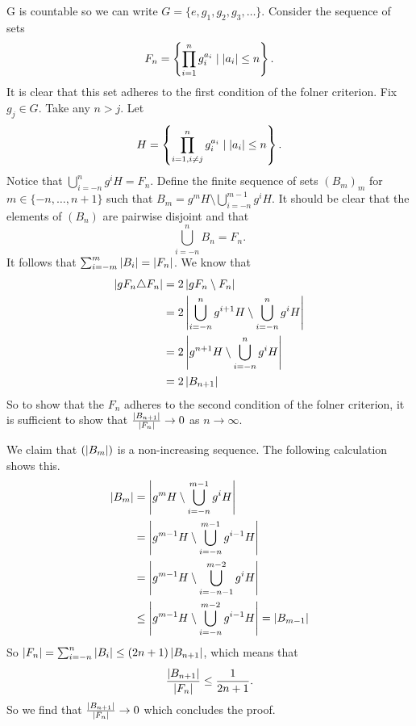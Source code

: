 G is countable so we can write $G = \{e, g_1, g_2, g_3, \dots\}$.
Consider the sequence of sets $$F_n = \left\{\prod_{i = 1}^n g_i^{a_i} \mid \left| a_i \right| \le n\right\}.$$ 
It is clear that this set adheres to the first condition of the folner criterion. 
Fix $g_j \in G$. Take any $n > j$.
Let $$H = \left\{\prod_{i = 1, i \ne j}^n g_i^{a_i} \mid \left| a_i \right| \le n\right\}.$$
Notice that $\bigcup_{i = -n}^{n} g^{i}H = F_n$.
Define the finite sequence of sets $(B_m)_m$ for $m \in \{-n, \dots, n+1\}$ such that  
$B_m = g^mH \setminus \bigcup_{i=-n}^{m-1}g^iH$.
It should be clear that the elements of $(B_n)$ are pairwise disjoint and that  \[
    \bigcup_{i = -n}^n B_n = F_n 
.\] 
It follows that $\sum_{i=-m}^{m} \left| B_i \right| = \left| F_n \right|$. We know that 
\begin{align*}
    \left| gF_n \triangle F_n \right| &= 2 \left| gF_n \setminus F_n \right| \\
    &= 2 \left| \bigcup_{i = -n}^n g^{i+1}H \setminus \bigcup_{i = -n}^n g^{i}H \right|\\
    &=  2 \left| g^{n+1}H \setminus \bigcup_{i = -n}^n g^{i}H \right|\\
    &= 2 \left| B_{n+1} \right|
\end{align*}
So to show that the $F_n$ adheres to the second condition of the folner criterion, it is sufficient to show that $\frac{\left| B_{n+1} \right|}{\left| F_n \right|} \to 0$ as $n \to \infty$.

We claim that $(\left| B_m \right|)$ is a non-increasing sequence. The following calculation shows this.
\begin{align*}
    \left| B_m \right| &= \left| g^{m}H \setminus \bigcup_{i=-n}^{m-1}g^iH \right|\\
    &= \left| g^{m-1}H \setminus \bigcup_{i=-n}^{m-1}g^{i-1}H \right|\\
    &= \left| g^{m-1}H \setminus \bigcup_{i=-n-1}^{m-2}g^{i}H \right|\\
    &\le \left| g^{m-1}H \setminus \bigcup_{i=-n}^{m-2}g^{i-1}H \right| = \left| B_{m-1} \right|
\end{align*}
So $\left| F_n \right| = \sum_{i=-n}^{n} \left| B_i \right| \le (2n+1) \left| B_{n+1} \right|$, which means that $$\frac{\left| B_{n+1} \right|}{\left| F_n \right|} \le \frac{1}{2n+1}.$$
So we find that $\frac{\left| B_{n+1} \right|}{\left| F_n \right|} \to 0$ which concludes the proof. 